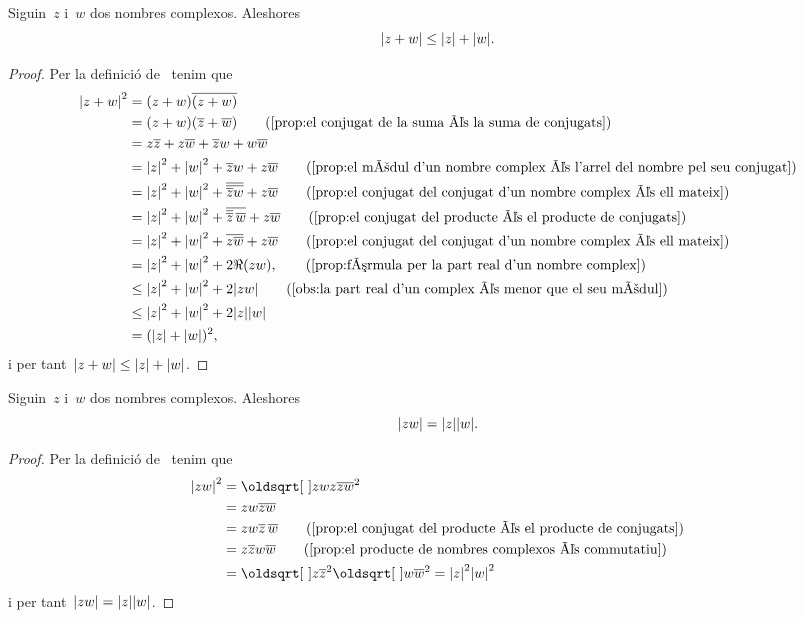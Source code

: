 \documentclass[../Apunts.tex]{subfiles}
\begin{document}
	\begin{proposition}
		\label{prop:desigualta triangular nombres complexos}
		Siguin~\(z\) i~\(w\) dos nombres complexos. Aleshores
		\[\modul{z+w}\leq\modul{z}+\modul{w}.\]
	\end{proposition}
	\begin{proof}
		Per la definició de~ tenim que
		\begin{align*}
			\modul{z+w}^{2}&=(z+w)\conjugat{(z+w)} \\
			&=(z+w)(\conjugat{z}+\conjugat{w}) \tag{\ref{prop:el conjugat de la suma és la suma de conjugats}} \\
			&=z\conjugat{z}+z\conjugat{w}+\conjugat{z}w+w\conjugat{w} \\
			&=\modul{z}^{2}+\modul{w}^{2}+\conjugat{z}w+z\conjugat{w} \tag{\ref{prop:el mòdul d'un nombre complex és l'arrel del nombre pel seu conjugat}} \\
			&=\modul{z}^{2}+\modul{w}^{2}+\conjugat{\conjugat{\conjugat{z}w}}+z\conjugat{w} \tag{\ref{prop:el conjugat del conjugat d'un nombre complex és ell mateix}} \\
			&=\modul{z}^{2}+\modul{w}^{2}+\conjugat{\conjugat{\conjugat{z}}\,\conjugat{w}}+z\conjugat{w} \tag{\ref{prop:el conjugat del producte és el producte de conjugats}} \\
			&=\modul{z}^{2}+\modul{w}^{2}+\conjugat{z\conjugat{w}}+z\conjugat{w}\tag{\ref{prop:el conjugat del conjugat d'un nombre complex és ell mateix}} \\
			&=\modul{z}^{2}+\modul{w}^{2}+2\Re(zw), \tag{\ref{prop:fórmula per la part real d'un nombre complex}} \\
			&\leq\modul{z}^{2}+\modul{w}^{2}+2\modul{zw} \tag{\ref{obs:la part real d'un complex és menor que el seu mòdul}} \\
			&\leq\modul{z}^{2}+\modul{w}^{2}+2\modul{z}\modul{w} \\
			&=(\modul{z}+\modul{w})^{2},
		\end{align*}
		i per tant~\(\modul{z+w}\leq\modul{z}+\modul{w}\).
	\end{proof}
	\begin{proposition}
		\label{prop:el producte de mòduls és el mòdul del producte}
		Siguin~\(z\) i~\(w\) dos nombres complexos. Aleshores
		\[\modul{zw}=\modul{z}\modul{w}.\]
	\end{proposition}
	\begin{proof}
		Per la definició de~ tenim que
		\begin{align*}
			\modul{zw}^{2}&=\sqrt{zwz\conjugat{zw}}^{2} \\
			&=zw\conjugat{zw} \\
			&=zw\conjugat{z}\,\conjugat{w} \tag{\ref{prop:el conjugat del producte és el producte de conjugats}} \\
			&=z\conjugat{z}w\conjugat{w} \tag{\ref{prop:el producte de nombres complexos és commutatiu}} \\
			&=\sqrt{z\conjugat{z}}^{2}\sqrt{w\conjugat{w}}^{2}=\modul{z}^{2}\modul{w}^{2}
		\end{align*}
		i per tant~\(\modul{zw}=\modul{z}\modul{w}\).
	\end{proof}
\end{document}
